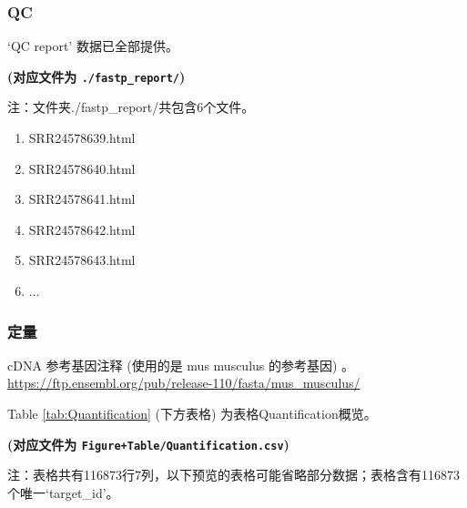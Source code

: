 \documentclass[
]{article}
\providecommand{\tightlist}{%
  \setlength{\itemsep}{0pt}\setlength{\parskip}{0pt}}
\begin{document}
\hypertarget{qc}{%
\subsubsection{QC}\label{qc}}

`QC report' 数据已全部提供。

\textbf{(对应文件为 \texttt{./fastp\_report/})}

\begin{center}\begin{tcolorbox}[colback=gray!10, colframe=gray!50, width=0.9\linewidth, arc=1mm, boxrule=0.5pt]注：文件夹./fastp\_report/共包含6个文件。

\begin{enumerate}\tightlist
\item SRR24578639.html
\item SRR24578640.html
\item SRR24578641.html
\item SRR24578642.html
\item SRR24578643.html
\item ...
\end{enumerate}\end{tcolorbox}
\end{center}

\hypertarget{ux5b9aux91cf}{%
\subsubsection{定量}\label{ux5b9aux91cf}}

cDNA 参考基因注释 (使用的是 mus musculus 的参考基因) 。
\url{https://ftp.ensembl.org/pub/release-110/fasta/mus_musculus/}

Table \ref{tab:Quantification} (下方表格) 为表格Quantification概览。

\textbf{(对应文件为 \texttt{Figure+Table/Quantification.csv})}

\begin{center}\begin{tcolorbox}[colback=gray!10, colframe=gray!50, width=0.9\linewidth, arc=1mm, boxrule=0.5pt]注：表格共有116873行7列，以下预览的表格可能省略部分数据；表格含有116873个唯一`target\_id'。
\end{tcolorbox}
\end{center}
\end{document}
